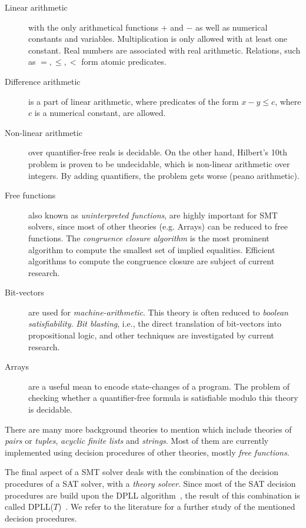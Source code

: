 \begin{description}
 \item[Linear arithmetic] with the only arithmetical functions $+$ and $-$ as well as numerical constants and variables. Multiplication is only allowed with at least one constant. Real numbers are associated with real arithmetic. Relations, such as $=, \leq, <$ form atomic predicates. 
 
 \item[Difference arithmetic] is a part of linear arithmetic, where predicates of the form $x - y \leq c$, where $c$ is a numerical constant, are allowed. 
 
 \item[Non-linear arithmetic] over quantifier-free reals is decidable. On the other hand, Hilbert's 10th problem is proven to be undecidable, which is non-linear arithmetic over integers. By adding quantifiers, the problem gets worse (peano arithmetic). 
 
 \item[Free functions] also known as \emph{uninterpreted functions}, are highly important for SMT solvers, since most of other theories (e.g. Arrays) can be reduced to free functions. The \emph{congruence closure algorithm} is the most prominent algorithm to compute the smallest set of implied equalities. Efficient algorithms to compute the congruence closure are subject of current research.
 
 \item[Bit-vectors] are used for \emph{machine-arithmetic}. This theory is often reduced to \emph{boolean satisfiability}. \emph{Bit blasting}, i.e., the direct translation of bit-vectors into propositional logic, and other techniques are investigated by current research.
 
 \item[Arrays] are a useful mean to encode state-changes of a program. The problem of checking whether a quantifier-free formula is satisfiable modulo this theory is decidable.
\end{description} 

There are many more background theories to mention which include theories of \emph{pairs} or \emph{tuples}, \emph{acyclic finite lists} and \emph{strings}. Most of them are currently implemented using decision procedures of other theories, mostly \emph{free functions}.



The final aspect of a SMT solver deals with the combination of the decision procedures of a SAT solver, with a \emph{theory solver}. Since most of the SAT decision procedures are build upon the DPLL algorithm~\cite{dpll}, the result of this combination is called  DPLL($T$)~\cite{dpllt}. We refer to the literature for a further study of the mentioned decision procedures.

